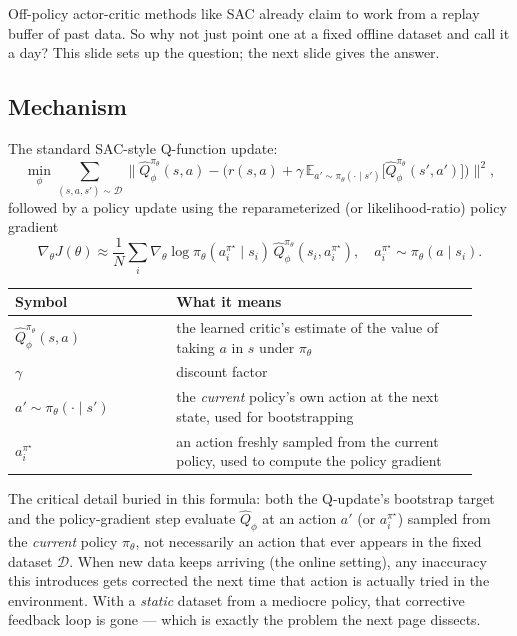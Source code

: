 \documentclass[11pt]{article}
\begin{document}
Off-policy actor-critic methods like SAC already claim to work from a replay buffer of past data. So why not just point one at a fixed offline dataset and call it a day? This slide sets up the question; the next slide gives the answer.

\subsection*{Mechanism}

The standard SAC-style Q-function update:
\[
\min_\phi \sum_{(s,a,s')\sim\mathcal{D}} \Big\lVert \hat Q^{\pi_\theta}_\phi(s,a) - \big(r(s,a) + \gamma\,\mathbb{E}_{a'\sim\pi_\theta(\cdot\mid s')}\big[\hat Q^{\pi_\theta}_\phi(s',a')\big]\big)\Big\rVert^2,
\]
followed by a policy update using the reparameterized (or likelihood-ratio) policy gradient
\[
\nabla_\theta J(\theta) \approx \frac{1}{N}\sum_i \nabla_\theta \log \pi_\theta(a_i^{\pi^\star}\mid s_i)\, \hat Q^{\pi_\theta}_\phi(s_i, a_i^{\pi^\star}), \quad a_i^{\pi^\star}\sim\pi_\theta(a\mid s_i).
\]

\begin{center}
\begin{tabular}{@{}p{0.32\linewidth}p{0.6\linewidth}@{}}
\toprule
Symbol & What it means \\
\midrule
$\hat Q^{\pi_\theta}_\phi(s,a)$ & the learned critic's estimate of the value of taking $a$ in $s$ under $\pi_\theta$ \\
$\gamma$ & discount factor \\
$a' \sim \pi_\theta(\cdot\mid s')$ & the \emph{current} policy's own action at the next state, used for bootstrapping \\
$a_i^{\pi^\star}$ & an action freshly sampled from the current policy, used to compute the policy gradient \\
\bottomrule
\end{tabular}
\end{center}

The critical detail buried in this formula: both the Q-update's bootstrap target and the policy-gradient step evaluate $\hat Q_\phi$ at an action $a'$ (or $a_i^{\pi^\star}$) sampled from the \emph{current} policy $\pi_\theta$, not necessarily an action that ever appears in the fixed dataset $\mathcal{D}$. When new data keeps arriving (the online setting), any inaccuracy this introduces gets corrected the next time that action is actually tried in the environment. With a \emph{static} dataset from a mediocre policy, that corrective feedback loop is gone --- which is exactly the problem the next page dissects.
\end{document}
